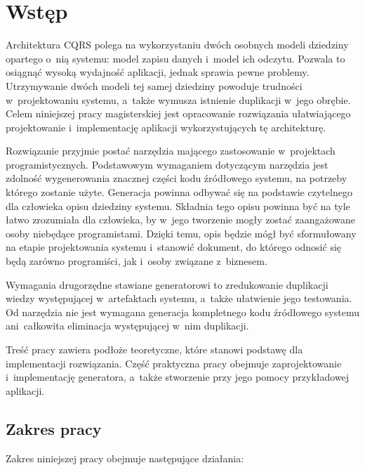 \chapter{Wstęp} \label{chap:intro}

Architektura CQRS polega na wykorzystaniu dwóch osobnych modeli dziedziny opartego o~nią systemu: model zapisu danych i~model ich odczytu.
Pozwala to osiągnąć wysoką wydajność aplikacji, jednak sprawia pewne problemy.
Utrzymywanie dwóch modeli tej samej dziedziny powoduje trudności w~projektowaniu systemu, a~także wymusza istnienie duplikacji w~jego obrębie.
Celem niniejszej pracy magisterskiej jest opracowanie rozwiązania ułatwiającego projektowanie i~implementację aplikacji wykorzystujących tę architekturę.

Rozwiązanie przyjmie postać narzędzia mającego zastosowanie w~projektach programistycznych.
Podstawowym wymaganiem dotyczącym narzędzia jest zdolność wygenerowania znacznej części kodu źródłowego systemu, na potrzeby którego zostanie użyte.
Generacja powinna odbywać się na podstawie czytelnego dla człowieka opisu dziedziny systemu.
Składnia tego opisu powinna być na tyle łatwo zrozumiała dla człowieka, by w~jego tworzenie mogły zostać zaangażowane osoby niebędące programistami.
Dzięki temu, opis będzie mógł być sformułowany na etapie projektowania systemu i~stanowić dokument, do którego odnosić się będą zarówno programiści, jak i~osoby związane z~biznesem.

Wymagania drugorzędne stawiane generatorowi to zredukowanie duplikacji wiedzy występującej w~artefaktach systemu, a~także ułatwienie jego testowania.
Od narzędzia nie jest wymagana generacja kompletnego kodu źródłowego systemu ani~całkowita eliminacja występującej w~nim duplikacji.

Treść pracy zawiera podłoże teoretyczne, które stanowi podstawę dla implementacji rozwiązania.
Część praktyczna pracy obejmuje zaprojektowanie i~implementację generatora, a~także stworzenie przy jego pomocy przykładowej aplikacji.



\section{Zakres pracy} \label{sec:intro:scope}

Zakres niniejszej pracy obejmuje następujące działania:

